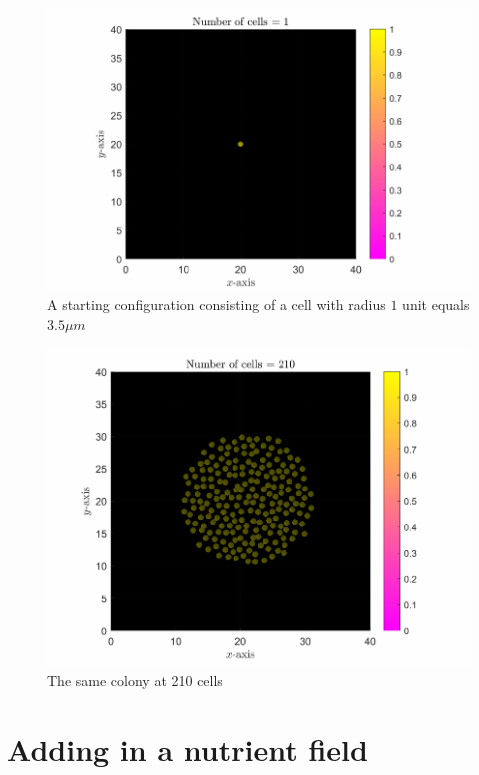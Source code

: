 \begin{figure}[h]
\centering
\includegraphics[width=1\textwidth]{chapter1/figures/ColonySimulationDemo_N_1.pdf}
\caption{A starting configuration consisting of a cell with radius $1$ unit equals $3.5 \mu m$}
\label{fig:ColonySimulationStartingCell}
\end{figure}
\filbreak


\begin{figure}[h]
\centering
\includegraphics[width=1\textwidth]{chapter1/figures/ColonySimulationDemo_N_210.pdf}
\caption{The same colony at 210 cells}
\label{fig:ColonySimulationN210}
\end{figure}
\filbreak

\section{Adding in a nutrient field}


